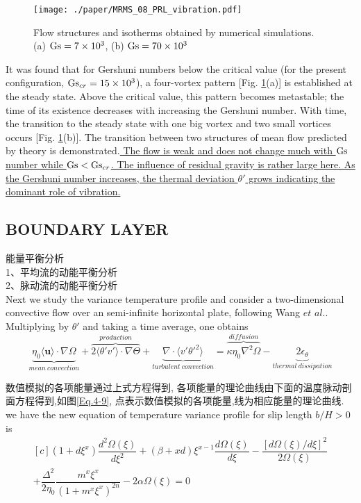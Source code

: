 \documentclass{hmj}
\newcommand\Gs{\mbox{\textrm{Gs}}} %
\begin{document}
\begin{figure}
  \centering
  \centering
  \texttt{[image: ./paper/MRMS\_08\_PRL\_vibration.pdf]}
  \renewcommand{\figurename}{Figure}
  \caption{Flow structures and isotherms obtained by numerical simulations. (a) $\Gs =7\times10^3$, (b) $\Gs=70\times10^3$}
  \renewcommand{\figurename}{图}
\label{fig3}
\end{figure}
It was found that for Gershuni numbers below the critical value (for the present configuration, $\Gs_{cr} =15\times 10^3$), a four-vortex pattern [Fig.  \ref{fig3}(a)] is established at the steady state. Above the critical value, this pattern becomes metastable; the time of its existence decreases with increasing the Gershuni number. With time, the transition to the steady state with one big vortex and two small vortices occurs [Fig. \ref{fig3}(b)]. The transition between two structures of mean flow predicted by theory is demonstrated.\ul{ The flow is weak and does not change much with $\Gs$ number while $\Gs < \Gs_{cr}$. The influence of residual gravity is rather large here. As the Gershuni number increases, the thermal deviation $\theta'$ grows indicating the dominant role of vibration.}

\subsection{BOUNDARY LAYER}
能量平衡分析\\

1、平均流的动能平衡分析\\

2、脉动流的动能平衡分析\\
Next we study the variance temperature profile and consider a two-dimensional convective flow over an semi-infinite horizontal plate, following Wang $et$ $al.$\citep[]{Wang2016,Wang2018b}. Multiplying by $\theta'$ and taking a time average, one obtains
\begin{equation}
\underbrace{\eta_0\langle\boldsymbol{u}\rangle\cdot\nabla\Omega}_{mean\ convection} + \overbrace{2\langle \theta'v'\rangle\cdot\nabla\Theta}^{production} + \underbrace{\nabla\cdot\langle v'\theta'^2\rangle}_{turbulent\  convection}= \overbrace{\kappa\eta_0\nabla^2\Omega}^{diffusion} - \underbrace{2\epsilon _\theta}_{thermal\ dissipation}
  \label{Eq.4-1}
\end{equation}

数值模拟的各项能量通过上式方程得到, 各项能量的理论曲线由下面的温度脉动剖面方程得到,如图\ref{Eq.4-9}, 点表示数值模拟的各项能量,线为相应能量的理论曲线. we have the new equation of temperature variance profile for slip length $b/H >0$ is
\begin{equation}
\begin{aligned}[c]
  (1+d\xi^x)\dfrac{d^2\Omega(\xi)}{d\xi^2}+(\beta+xd)\xi^{x-1}\dfrac{d\Omega(\xi)}{d\xi}
    -\dfrac{[d\Omega(\xi)/d\xi]^2}{2\Omega(\xi)}\\
  +\dfrac{\Delta^2}{2\eta_0}\dfrac{m^x\xi^x}{(1+m^x\xi^x)^{2n}}
-2\alpha\Omega(\xi)=0
  \label{Eq.4-9}
  \end{aligned}
\end{equation}
\end{document}
